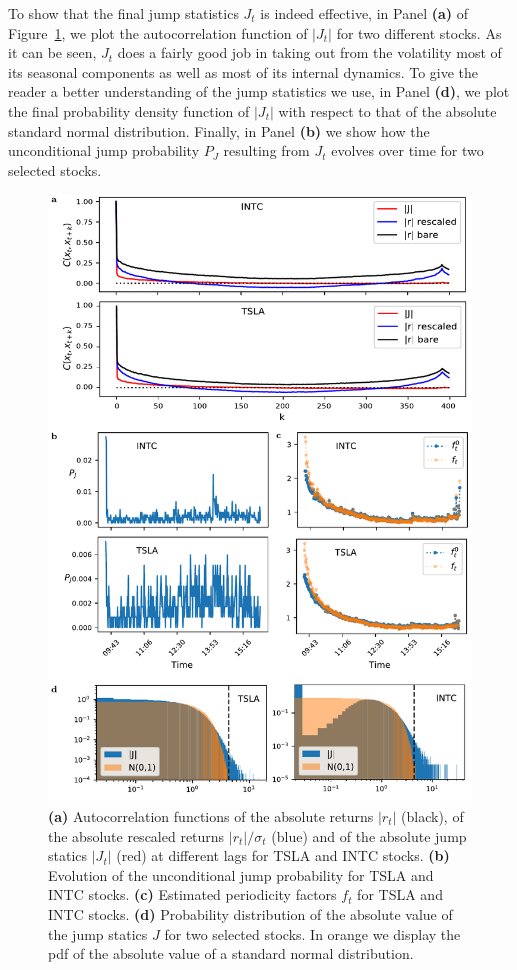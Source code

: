 \documentclass[amsmath,amssymb,aps,pre,floatfix,twocolumn,superscriptaddress]{revtex4}
\begin{document}
To show that the final jump statistics $J_t$ is indeed effective, in Panel \textbf{(a)} of Figure~\ref{fig: appendix 1}, we plot the autocorrelation function of $\vert J_t\vert$ for two different stocks. As it can be seen, $J_t$ does a fairly good job in taking out from the volatility most of its seasonal components as well as most of its internal dynamics. To give the reader a better understanding of the jump statistics we use, in Panel \textbf{(d)}, we plot the final probability density function of $\vert J_t\vert$ with respect to that of the absolute standard normal distribution. Finally, in Panel \textbf{(b)} we show how the unconditional jump probability $P_J$ resulting from $J_t$ evolves over time for two selected stocks.

\begin{figure}
  \centering
  \includegraphics[width=0.8\linewidth]{appendix_plots/appendix_plot_J.pdf}
  \caption{\textbf{(a)} Autocorrelation functions of the absolute returns $\vert r_t\vert$ (black), of the absolute rescaled returns $\vert r_t\vert/\sigma_t$ (blue) and of the absolute jump statics $\vert J_t\vert$ (red) at different lags for TSLA and INTC stocks.  \textbf{(b)} Evolution of the unconditional jump probability for TSLA and INTC stocks. \textbf{(c)} Estimated periodicity factors $f_t$ for TSLA and INTC stocks. \textbf{(d)} Probability distribution of the absolute value of the jump statics $J$ for two selected stocks. In orange we display the pdf of the absolute value of a standard normal distribution.}  
  \label{fig: appendix 1}
\end{figure}
\end{document}
